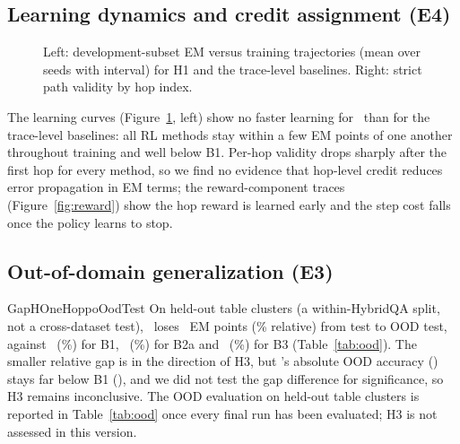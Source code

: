 \subsection{Learning dynamics and credit assignment (E4)}
\begin{figure}[t]
\centering
{}\hfill
{}
\caption{Left: development-subset EM versus training trajectories (mean over seeds with interval) for H1 and the trace-level baselines. Right: strict path validity by hop index.}
\label{fig:curves}
\end{figure}

The learning curves (Figure~\ref{fig:curves}, left) show no faster learning for \hop\ than for the trace-level baselines: all RL methods stay within a few EM points of one another throughout training and well below B1.
Per-hop validity drops sharply after the first hop for every method, so we find no evidence that hop-level credit reduces error propagation in EM terms; the reward-component traces (Figure~\ref{fig:reward}) show the hop reward is learned early and the step cost falls once the policy learns to stop.

\subsection{Out-of-domain generalization (E3)}
\begin{table}[t]
\centering\small
\resizebox{\columnwidth}{!}{}
\caption{EM on in-domain test versus the held-out-cluster OOD split, with absolute and relative gap, per method.}
\label{tab:ood}
\end{table}

\ifcsname GapHOneHoppoOodTest\endcsname
On held-out table clusters (a within-HybridQA split, not a cross-dataset test), \hop\ loses \GapHOneHoppoOodTest\ EM points (\GaprelHOneHoppoOodTest\% relative) from test to OOD test, against \GapBOneSftOodTest\ (\GaprelBOneSftOodTest\%) for B1, \GapBTwoAGrpoOodTest\ (\GaprelBTwoAGrpoOodTest\%) for B2a and \GapBThreeSoftOodTest\ (\GaprelBThreeSoftOodTest\%) for B3 (Table~\ref{tab:ood}).
The smaller relative gap is in the direction of H3, but \hop's absolute OOD accuracy (\OodemHOneHoppoOodTest) stays far below B1 (\OodemBOneSftOodTest), and we did not test the gap difference for significance, so H3 remains inconclusive.
\else
The OOD evaluation on held-out table clusters is reported in Table~\ref{tab:ood} once every final run has been evaluated; H3 is not assessed in this version.
\fi


